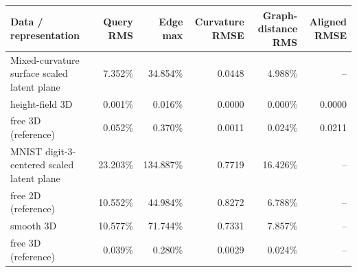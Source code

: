 \begin{tabular}{lrrrrr}
\toprule
Data / representation & Query RMS & Edge max & Curvature RMSE & Graph-distance RMS & Aligned RMSE \\
\midrule
Mixed-curvature surface scaled latent plane & 7.352\% & 34.854\% & 0.0448 & 4.988\% & -- \\
 height-field 3D & 0.001\% & 0.016\% & 0.0000 & 0.000\% & 0.0000 \\
 free 3D (reference) & 0.052\% & 0.370\% & 0.0011 & 0.024\% & 0.0211 \\
\addlinespace
MNIST digit-3-centered scaled latent plane & 23.203\% & 134.887\% & 0.7719 & 16.426\% & -- \\
 free 2D (reference) & 10.552\% & 44.984\% & 0.8272 & 6.788\% & -- \\
 smooth 3D & 10.577\% & 71.744\% & 0.7331 & 7.857\% & -- \\
 free 3D (reference) & 0.039\% & 0.280\% & 0.0029 & 0.024\% & -- \\
\bottomrule
\end{tabular}
